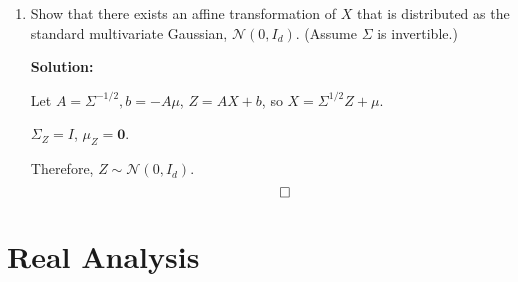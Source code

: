 \documentclass{article}
\newcommand{\Question}[1]{\Large \section{ #1 } \normalsize}
\DeclareMathOperator{\E}{\mathbb{E}}
\newenvironment{solution}{\color{blue} \smallskip \textbf{Solution:}}{}
\begin{document}
\begin{enumerate}
    \begin{solution}
        \begin{align*}
            M_{AX+b}(\lambda) &= \E[{\lambda^\top (AX+b)}]\\
            &= e^{\lambda^\top b} \E[{\lambda^\top AX}] \\
            &= e^{\lambda^\top b} M_X(A^\top \lambda) \\
            &= \exp\left(\lambda^\top b + \lambda^\top A \mu + \frac12 \lambda^\top A \Sigma A^\top \lambda\right) \\
            &= \exp\left(\lambda^\top (A \mu + b) + \frac12 \lambda^\top A \Sigma A^\top \lambda\right)
        \end{align*}
        Therefore, $$\Sigma_{AX+b} = A\Sigma_{X}A^\top,\quad \mu_{AX+b} = A \mu_{X} + b$$.
        \[ \qedhere \]
    \end{solution}

    \item
    Show that there exists an affine transformation of $X$ that is distributed as the standard multivariate Gaussian, $\mathcal{N}(0, I_d)$. (Assume $\Sigma$ is invertible.) 

    \begin{solution}
        
        Let $A = \Sigma^{-1/2}, b = -A\mu$, $Z = AX + b$, so $X = \Sigma^{1/2}Z + \mu$. 
        
        $\Sigma_Z = I$, $\mu_Z = \mathbf{0}$.

        Therefore, $Z \sim \mathcal{N}(0, I_d)$.
        \[ \qedhere \]
    \end{solution}

\end{enumerate}

\newpage
\Question{Real Analysis}
\end{document}
